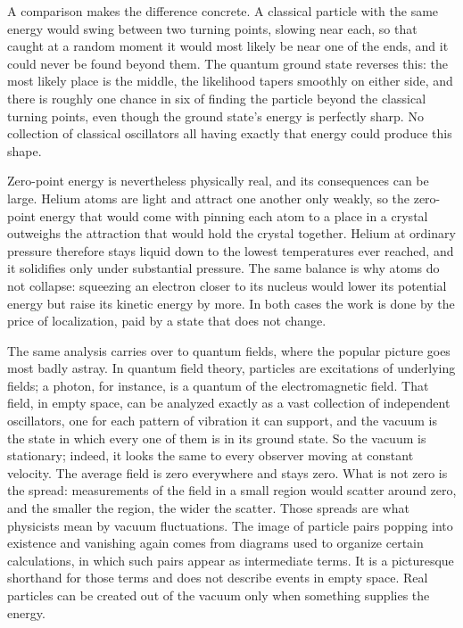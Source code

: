 A comparison makes the difference concrete. A classical particle with the same energy would swing between two turning points, slowing near each, so that caught at a random moment it would most likely be near one of the ends, and it could never be found beyond them. The quantum ground state reverses this: the most likely place is the middle, the likelihood tapers smoothly on either side, and there is roughly one chance in six of finding the particle beyond the classical turning points, even though the ground state's energy is perfectly sharp. No collection of classical oscillators all having exactly that energy could produce this shape.

Zero-point energy is nevertheless physically real, and its consequences can be large. Helium atoms are light and attract one another only weakly, so the zero-point energy that would come with pinning each atom to a place in a crystal outweighs the attraction that would hold the crystal together. Helium at ordinary pressure therefore stays liquid down to the lowest temperatures ever reached, and it solidifies only under substantial pressure. The same balance is why atoms do not collapse: squeezing an electron closer to its nucleus would lower its potential energy but raise its kinetic energy by more. In both cases the work is done by the price of localization, paid by a state that does not change.

The same analysis carries over to quantum fields, where the popular picture goes most badly astray. In quantum field theory, particles are excitations of underlying fields; a photon, for instance, is a quantum of the electromagnetic field. That field, in empty space, can be analyzed exactly as a vast collection of independent oscillators, one for each pattern of vibration it can support, and the vacuum is the state in which every one of them is in its ground state. So the vacuum is stationary; indeed, it looks the same to every observer moving at constant velocity. The average field is zero everywhere and stays zero. What is not zero is the spread: measurements of the field in a small region would scatter around zero, and the smaller the region, the wider the scatter. Those spreads are what physicists mean by vacuum fluctuations. The image of particle pairs popping into existence and vanishing again comes from diagrams used to organize certain calculations, in which such pairs appear as intermediate terms. It is a picturesque shorthand for those terms and does not describe events in empty space. Real particles can be created out of the vacuum only when something supplies the energy.

